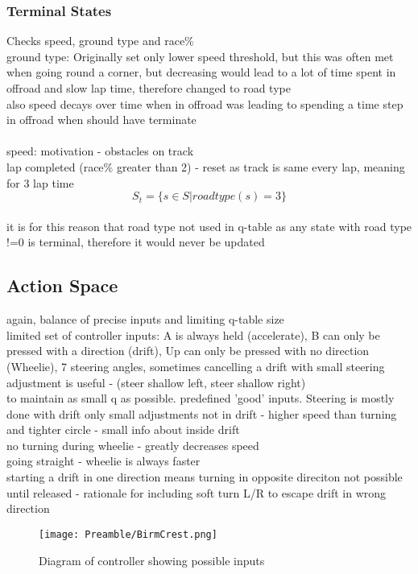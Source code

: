 \subsubsection{Terminal States}
Checks speed, ground type and race\%\\
ground type: Originally set only lower speed threshold, but this was often met when going round a corner, but decreasing would lead to a lot of time spent in offroad and slow lap time, therefore changed to road type\\ also speed decays over time when in offroad was leading to spending a time step in offroad when should have terminate\\
\\speed: motivation - obstacles on track
\\lap completed (race\% greater than 2) - reset as track is same every lap, meaning for 3 lap time 
\[ S_t = \{s \in S | roadtype(s) = 3 \}\]
\\ it is for this reason that road type not used in q-table as any state with road type !=0 is terminal, therefore it would never be updated

\subsection{Action Space}
again, balance of precise inputs and limiting q-table size
\\limited set of controller inputs: A is always held (accelerate), B can only be pressed with a direction (drift), Up can only be pressed with no direction (Wheelie), 7 steering angles, sometimes cancelling a drift with small steering adjustment is useful - (steer shallow left, steer shallow right)
\\ to maintain as small q as possible. predefined 'good' inputs. Steering is mostly done with drift only small adjustments not in drift - higher speed than turning and tighter circle - small info about inside drift
\\ no turning during wheelie - greatly decreases speed 
\\ going straight - wheelie is always faster
\\starting a drift in one direction means turning in opposite direciton not possible until released - rationale for including soft turn L/R to escape drift in wrong direction
\begin{figure}
    \centering
    \texttt{[image: Preamble/BirmCrest.png]}
    \caption{Diagram of controller showing possible inputs}
    \label{fig:emulated-controller}
\end{figure}
